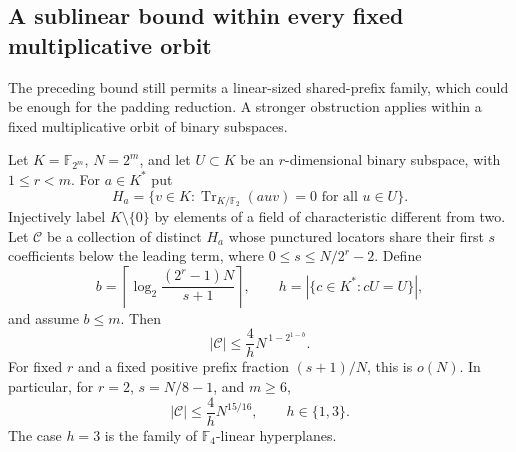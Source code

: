 \subsection*{A sublinear bound within every fixed multiplicative orbit}

The preceding bound still permits a linear-sized shared-prefix family,
which could be enough for the padding reduction. A stronger obstruction
applies within a fixed multiplicative orbit of binary subspaces.

\begin{theorem}
\label{thm:multiplicative-orbit-transfer}
Let $K=\mathbb F_{2^m}$, $N=2^m$, and let $U\subset K$ be an
$r$-dimensional binary subspace, with $1\le r<m$. For $a\in K^*$ put
\[
 H_a=\{v\in K:\operatorname{Tr}_{K/\mathbb F_2}(auv)=0
                         \text{ for all }u\in U\}.
\]
Injectively label $K\setminus\{0\}$ by elements of a field of
characteristic different from two. Let $\mathcal C$ be a collection
of distinct $H_a$ whose punctured locators share their first $s$
coefficients below the leading term, where $0\le s\le N/2^r-2$.
Define
\[
 b=\left\lceil\log_2\frac{(2^r-1)N}{s+1}\right\rceil,
 \qquad h=|\{c\in K^*:cU=U\}|,
\]
and assume $b\le m$. Then
\[
 |\mathcal C|\le\frac4h N^{\,1-2^{1-b}}.
\]
For fixed $r$ and a fixed positive prefix fraction $(s+1)/N$, this
is $o(N)$. In particular, for $r=2$, $s=N/8-1$, and $m\ge6$,
\[
 |\mathcal C|\le\frac4h N^{15/16},\qquad h\in\{1,3\}.
\]
The case $h=3$ is the family of $\mathbb F_4$-linear hyperplanes.
\end{theorem}
